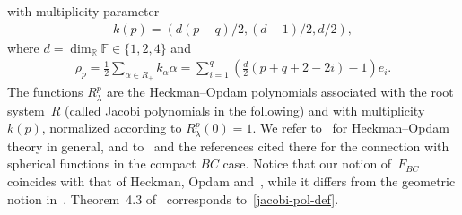 \documentclass[pdftex]{sigma}
\numberwithin{equation}{section}
\begin{document}
with multiplicity parameter
\begin{gather}
\label{multipl}
k(p)=(d(p-q)/2, (d-1)/2, d/2),
\end{gather}
where $d=\dim_\mathbb R \mathbb F \in \{1,2,4\}$ and
\begin{gather*}
\rho_p=\frac{1}{2}\sum\limits_{\alpha\in R_+} k_\alpha\alpha=\sum\limits_{i=1}^q \left(\frac{d}{2}(p+q+2-2i) -1\right)e_i.
\end{gather*}
The functions $R_\lambda^p$ are the Heckman--Opdam polynomials associated with the root system~$R$ (called Jacobi
polynomials in the following) and with multiplicity $k(p)$, normalized according to $R_\lambda^p(0)=1$.
We refer to~\cite{H,HS,O1} for Heckman--Opdam theory in general, and to~\cite{RR} and the references
cited there for the connection with spherical functions in the compact $BC$ case.
Notice that our notion of~$F_{BC}$ coincides with that of Heckman, Opdam and~\cite{R2,RV2}, while it dif\/fers
from the geometric notion in~\cite{RR}.
Theorem~4.3 of~\cite{RR} corresponds to~\eqref{jacobi-pol-def}.
\end{document}
